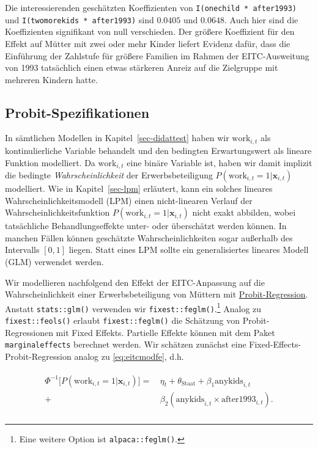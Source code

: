 \documentclass[
  a4paper,
  DIV=11,
  oneside]{scrreprt}
\begin{document}
Die interessierenden geschätzten Koeffizienten von
\texttt{I(onechild\ *\ after1993)} und
\texttt{I(twomorekids\ *\ after1993)} sind \(0.0405\) und \(0.0648\).
Auch hier sind die Koeffizienten signifikant von null verschieden. Der
größere Koeffizient für den Effekt auf Mütter mit zwei oder mehr Kinder
liefert Evidenz dafür, dass die Einführung der Zahlstufe für größere
Familien im Rahmen der EITC-Ausweitung von 1993 tatsächlich einen etwas
stärkeren Anreiz auf die Zielgruppe mit mehreren Kindern hatte.

\subsection{Probit-Spezifikationen}\label{sec-eitc-probit}

In sämtlichen Modellen in Kapitel~\ref{sec-didattest} haben wir
\(\text{work}_{i,t}\) als kontinulierliche Variable behandelt und den
bedingten Erwartungswert als lineare Funktion modelliert. Da
\(\text{work}_{i,t}\) eine binäre Variable ist, haben wir damit implizit
die bedingte \emph{Wahrscheinlichkeit} der Erwerbsbeteiligung
\(P(\text{work}_{i,t} = 1\vert \boldsymbol{x}_{i,t})\) modelliert. Wie
in Kapitel~\ref{sec-lpm} erläutert, kann ein solches lineares
Wahrscheinlichkeitsmodell (LPM) einen nicht-linearen Verlauf der
Wahrscheinlichkeitsfunktion
\(P(\text{work}_{i,t} = 1\vert \boldsymbol{x}_{i,t})\) nicht exakt
abbilden, wobei tatsächliche Behandlungseffekte unter- oder überschätzt
werden können. In manchen Fällen können geschätzte Wahrscheinlichkeiten
sogar außerhalb des Intervalls \([0,1]\) liegen. Statt eines LPM sollte
ein generalisiertes lineares Modell (GLM) verwendet werden.

Wir modellieren nachfolgend den Effekt der EITC-Anpassung auf die
Wahrscheinlichkeit einer Erwerbsbeteiligung von Müttern mit
\hyperref[sec-abcd]{Probit-Regression}. Anstatt \texttt{stats::glm()}
verwenden wir \texttt{fixest::feglm()}.\footnote{Eine weitere Option ist
  \texttt{alpaca::feglm()}.} Analog zu \texttt{fixest::feols()} erlaubt
\texttt{fixest::feglm()} die Schätzung von Probit-Regressionen mit Fixed
Effekts. Partielle Effekte können mit dem Paket \texttt{marginaleffects}
berechnet werden. Wir schätzen zunächst eine
Fixed-Effects-Probit-Regression analog zu \eqref{eq:eitcmodfe}, d.h.

\begin{align}
  \begin{split}
    \Phi^{-1}\bigg[P(\text{work}_{i,t} = 1\vert \boldsymbol{x}_{i,t})\bigg] 
    =&\, \eta_t + \theta_\text{Staat} + \beta_1 \text{anykids}_{i,t}\\ 
    +&\, \beta_2 (\text{anykids}_{i,t} \times \text{after1993}_{i,t}).\\
  \end{split}
\end{align}
\end{document}
